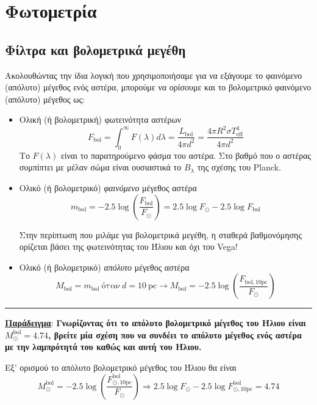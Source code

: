 \chapter{Φωτομετρία}
\label{ch:Chapter3}
{\hypersetup{linkcolor=black, pdfborder=0 0 1}
	\minitoc
}
\section{Φίλτρα και βολομετρικά μεγέθη}

Ακολουθώντας την ίδια λογική που χρησιμοποιήσαμε για να εξάγουμε το φαινόμενο (απόλυτο) μέγεθος ενός αστέρα, μπορούμε να ορίσουμε και το βολομετρικό φαινόμενο (απόλυτο) μέγεθος ως:

\begin{itemize}
    \item Ολική (ή βολομετρική) φωτεινότητα αστέρων 
    $$F_{\text{bol}} = \int_0^{\infty}F(\lambda) d\lambda = \frac{L_{\text{bol}}}{4 \pi d^2} = \frac{4\pi R^2 \sigma T_{\text{eff}}^4}{4\pi d^2}$$
    Το $F(\lambda)$ είναι το παρατηρούμενο φάσμα του αστέρα. Στο βαθμό που ο αστέρας συμπίπτει με μέλαν σώμα είναι ουσιαστικά το $B_{\lambda}$ της σχέσης του Planck.
    \item Ολικό (ή βολομετρικό) \textit{φαινόμενο} μέγεθος αστέρα 
    $$m_{\text{bol}} = -2.5 \log \left( \frac{F_{\text{bol}}}{F_{\odot}} \right) = 2.5 \log F_{\odot} - 2.5 \log F_{\text{bol}}$$
    
    Στην περίπτωση που μιλάμε για βολομετρικά μεγέθη, η σταθερά βαθμονόμησης ορίζεται βάσει της φωτεινότητας του Ήλιου και όχι του Vega!
    \item Ολικό (ή βολομετρικό) \textit{απόλυτο} μέγεθος αστέρα
    $$M_{\text{bol}} = m_{\text{bol}} \ \text{όταν} \ d = 10 \ \text{pc} \longrightarrow M_{\text{bol}} = -2.5 \log \left( \frac{F_{\text{bol}, 10 \text{pc}}}{F_{\odot}} \right)$$
\end{itemize}
\hrule 
\underline{\textbf{Παράδειγμα}}:
\textbf{Γνωρίζοντας ότι το απόλυτο βολομετρικό μέγεθος του Ήλιου είναι $M_{\odot}^{\text{bol}} = 4.74$, βρείτε μία σχέση που να συνδέει το απόλυτο μέγεθος ενός αστέρα με την λαμπρότητά του καθώς και αυτή του Ήλιου.}

Εξ' ορισμού το απόλυτο βολομετρικό μέγεθος του Ήλιου θα είναι
$$M_{\odot}^{\text{bol}} = -2.5 \log \left( \frac{F_{\odot, \text{10pc}}^{\text{bol}}}{F_{\odot}} \right) \Rightarrow 2.5 \log F_{\odot} - 2.5 \log F_{\odot, \text{10pc}}^{\text{bol}} = 4.74 $$

